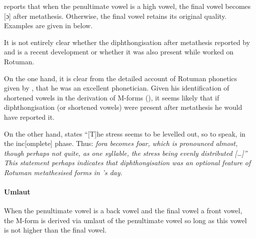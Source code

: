 \citet[208]{be87} reports that when the penultimate vowel is a high vowel,
the final vowel becomes [ɔ] after metathesis.
Otherwise, the final vowel retains its original quality.
Examples are given in  below.

\begin{exe}
	\label{ex:VCV->VVC-Bes}
\end{exe}

It is not entirely clear whether the diphthongisation
after metathesis reported by \cite{be87} and \cite{va02}
is a recent development or whether it was also present
while \citeauthor{ch40} worked on Rotuman.

On the one hand, it is clear from the detailed account of
Rotuman phonetics given by \citet[64--84]{ch40},
that he was an excellent phonetician.
Given his identification of shortened vowels
in the derivation of M-forms (),
it seems likely that if diphthongisation (or shortened vowels)
were present after metathesis he would have reported it.

On the other hand, \citet[86]{ch40} states
``[T]he stress seems to be levelled out, so
to speak, in the inc[omplete] phase.
Thus: \it{fo}ra becomes \it{foar}, which is pronounced almost,
though perhaps not quite, as one syllable,
the stress being evenly distributed [\ldots]''
This statement perhaps indicates that diphthongisation
was an optional feature of Rotuman metathesised
forms in \citeauthor{ch40}'s day.

\paragraph{Umlaut}\label{sec:RotUml}
When the penultimate vowel is a back vowel and the final vowel a front vowel,
the M-form is derived via umlaut of the penultimate vowel
so long as this vowel is not higher than the final vowel.

